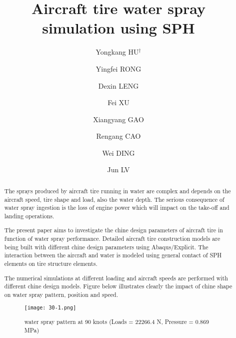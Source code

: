 \documentclass[10pt]{article}
\title{Aircraft tire water spray simulation using SPH}
\date{}
\author[1]{Yongkang HU$^\dagger$}
\author[1]{Yingfei RONG}
\author[1]{Dexin LENG}
\affil[1]{Triangle Tire R\&D, China}
\author[2]{Fei XU}
\author[2]{Xiangyang GAO}
\affil[2]{Northwest Polytechnical University, China}
\author[3]{Rengang CAO}
\author[3]{Wei DING}
\author[3]{Jun LV}
\affil[3]{COMAC, China}
\affil[$\relax$]{\email{\dagger}{huyongkang@triangle.com.cn}}
\begin{document}
\maketitle


\begin{abstract}
The sprays produced by aircraft tire running in water are complex and depends on the aircraft speed, tire shape and load, also the water depth. The serious consequence of water spray ingestion is the loss of engine power which will impact on the take-off and landing operations.

The present paper aims to investigate the chine design parameters of aircraft tire in function of water spray performance. Detailed aircraft tire construction models are being built with different chine design parameters using Abaqus/Explicit. The interaction between the aircraft and water is modeled using general contact of SPH elements on tire structure elements.

The numerical simulations at different loading and aircraft speeds are performed with different chine design models. Figure below illustrates clearly the impact of chine shape on water spray pattern, position and speed. 

\begin{figure}[!htb]
\centering
\texttt{[image: 30-1.png]}
\caption{water spray pattern at 90 knots (Loads = 22266.4 N, Pressure = 0.869 MPa)}\label{fig:30}
\end{figure}

\end{abstract}



\addbib
\end{document}
